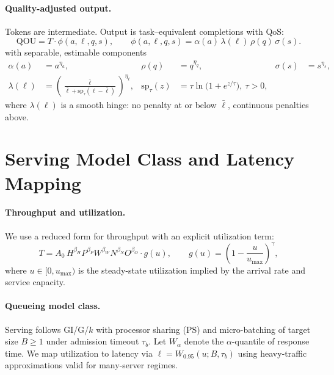 \documentclass[12pt]{article}
\numberwithin{equation}{section}
\theoremstyle{definition}
\theoremstyle{plain}
\newcommand{\QOU}{\mathrm{QOU}}
\begin{document}
\paragraph{Quality-adjusted output.}
Tokens are intermediate. Output is task–equivalent completions with QoS:
\begin{equation}
\QOU
= T \cdot \phi(a,\ell,q,s),\qquad
\phi(a,\ell,q,s)=\alpha(a)\,\lambda(\ell)\,\rho(q)\,\sigma(s).
\end{equation}
with separable, estimable components
\begin{align}
\alpha(a) &= a^{\eta_a}, &
\rho(q) &= q^{\eta_q}, &
\sigma(s) &= s^{\eta_s},\\
\lambda(\ell)
&= \left(\frac{\bar\ell}{\bar\ell+\mathrm{sp}_\tau(\ell-\bar\ell)}\right)^{\eta_\ell},&
\mathrm{sp}_\tau(z)&=\tau\ln\!\big(1+e^{z/\tau}\big),\ \tau>0,
\end{align}
where $\lambda(\ell)$ is a smooth hinge: no penalty at or below $\bar\ell$, continuous penalties above.

\section{Serving Model Class and Latency Mapping}
\paragraph{Throughput and utilization.}
We use a reduced form for throughput with an explicit utilization term:
\begin{equation}\label{eq:throughput}
T
= A_0\,H^{\beta_H} P^{\beta_P} W^{\beta_W} N^{\beta_N} O^{\beta_O}\cdot g(u),\qquad
 g(u)=\left(1-\frac{u}{u_{\max}}\right)^{\gamma},
\end{equation}
where $u\in[0,u_{\max})$ is the steady-state utilization implied by the arrival rate and service capacity.

\paragraph{Queueing model class.}
Serving follows GI/G/$k$ with processor sharing (PS) and micro-batching of target size $B\ge1$ under admission timeout $\tau_b$. Let $W_\alpha$ denote the $\alpha$-quantile of response time. We map utilization to latency via $\ell = W_{0.95}(u;B,\tau_b)$ using heavy-traffic approximations valid for many-server regimes.
\end{document}
